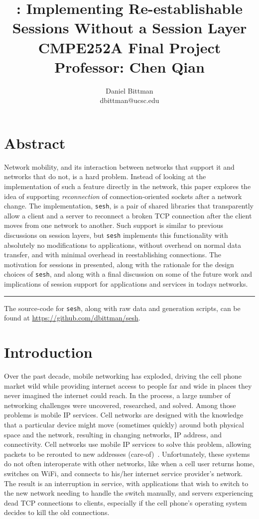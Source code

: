 \documentclass[twocolumn,11pt]{article}
\author{Daniel Bittman \\ dbittman@ucsc.edu}
\title{\sesh: \textbf{Implementing Re-establishable\\Sessions Without a Session Layer}
\\
{\vspace{5mm}\normalsize CMPE252A Final Project\\\vspace{-3mm} Professor: Chen Qian}
}
\newcommand{\sesh}{\texttt{sesh}\xspace}
\begin{document}
\biolinum
\maketitle
\libertine
\renewcommand\ttdefault{lmtt}

\section*{Abstract}

Network mobility, and its interaction between networks that support it and
networks that do not, is a hard problem. Instead of looking at the implementation
of such a feature directly in the network, this paper explores the idea of
supporting \textit{reconnection} of connection-oriented sockets after a network
change. The implementation, \sesh, is a pair of shared libraries that
transparently allow a client and a server to reconnect a broken TCP connection
after the client moves from one network to another. Such support is similar to
previous discussions on session layers, but \sesh implements this functionality
with absolutely no modifications to applications, without overhead on normal
data transfer, and with minimal overhead in reestablishing connections. The
motivation for sessions in presented, along with the rationale for the design
choices of \sesh, and along with a final discussion on some of the future work
and implications of session support for applications and services in todays
networks.

\begin{center}\noindent\rule{2cm}{0.4pt}\end{center}

The source-code for \sesh, along with raw data and generation scripts,
can be found at \url{https://github.com/dbittman/sesh}.

\section{Introduction}

Over the past decade, mobile networking has exploded, driving the cell phone
market wild while providing internet access to people far and wide in places
they never imagined the internet could reach. In the process, a large number of
networking challenges were uncovered, researched, and solved. Among those
problems is mobile IP services. Cell networks are designed with the knowledge
that a particular device might move (sometimes quickly) around both physical
space and the network, resulting in changing networks, IP address, and
connectivity. Cell networks use mobile IP services to solve this problem,
allowing packets to be rerouted to new addresses (care-of)~\cite{Kurose,mobileip}.
Unfortunately, these systems do not often interoperate
with other networks, like when a cell user returns home, switches on WiFi, and
connects to his/her internet service provider's network. The result is an
interruption in service, with applications that wish to switch to the new
network needing to handle the switch manually, and servers experiencing dead TCP
connections to clients, especially if the cell phone's operating system decides
to kill the old connections.
\end{document}
